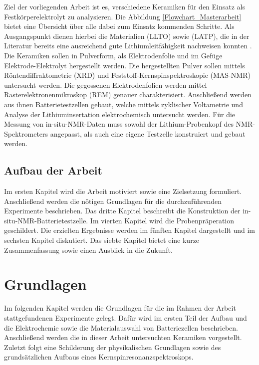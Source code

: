 \documentclass[a4paper, 11pt, headsepline,footsepline,twoside,abstract]{scrbook}
\begin{document}
Ziel der vorliegenden Arbeit ist es, verschiedene Keramiken für den Einsatz als Festkörperelektrolyt zu analysieren. Die Abbildung \ref{Flowchart_Masterarbeit} bietet eine Übersicht über alle dabei zum Einsatz kommenden Schritte. Als Ausgangspunkt dienen hierbei die Materialien  (LLTO) sowie  (LATP), die in der Literatur bereits eine ausreichend gute Lithiumleitfähigkeit nachweisen konnten \cite{tatsumisago2013recent}. Die Keramiken sollen in Pulverform, als Elektrodenfolie und im Gefüge Elektrode-Elektrolyt hergestellt werden. Die hergestellten Pulver sollen mittels Röntendiffraktometrie (XRD) und Feststoff-Kernspinspektroskopie (MAS-NMR) untersucht werden. Die gegossenen Elektrodenfolien werden mittel Rasterelektronenmikroskop (REM) genauer charakterisiert. Anschließend werden aus ihnen Batterietestzellen gebaut, welche mittels zyklischer Voltametrie und Analyse der Lithiuminsertation elektrochemisch untersucht werden. Für die Messung von in-situ-NMR-Daten muss sowohl der Lithium-Probenkopf des NMR-Spektrometers angepasst, als auch eine eigene Testzelle konstruiert und gebaut werden.
\section{Aufbau der Arbeit}
Im ersten Kapitel wird die Arbeit motiviert sowie eine Zielsetzung formuliert. Anschließend werden die nötigen Grundlagen für die durchzuführenden Experimente beschrieben. Das dritte Kapitel beschreibt die Konstruktion der in-situ-NMR-Batterietestzelle. Im vierten Kapitel wird die Probenpräperation geschildert. Die erzielten Ergebnisse werden im fünften Kapitel dargestellt und im sechsten Kapitel diskutiert. Das siebte Kapitel bietet eine kurze Zusammenfassung sowie einen Ausblick in die Zukunft.
\chapter{Grundlagen}
Im folgenden Kapitel werden die Grundlagen für die im Rahmen der Arbeit stattgefundenen Experimente gelegt. Dafür wird im ersten Teil der Aufbau und die Elektrochemie sowie die Materialauswahl von Batteriezellen beschrieben. Anschließend werden die in dieser Arbeit untersuchten Keramiken vorgestellt. Zuletzt folgt eine Schilderung der physikalischen Grundlagen sowie des grundsätzlichen Aufbaus eines Kernspinresonanzspektroskops.
\end{document}
